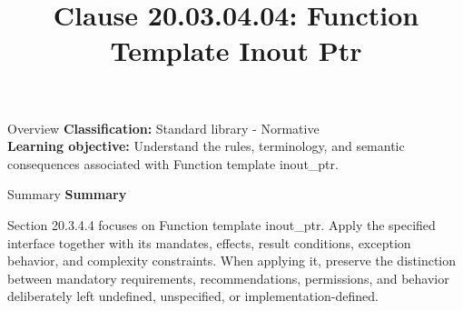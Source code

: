 \documentclass[10pt,letterpaper]{article}
\title{Clause 20.03.04.04: Function Template Inout Ptr}
\author{}
\date{}
\begin{document}
\maketitle
\begin{CornellOverviewBox}{Overview}
\textbf{Classification:} Standard library - Normative\\[2pt]
\textbf{Learning objective:} Understand the rules, terminology, and semantic consequences associated with Function template inout\_ptr.
\end{CornellOverviewBox}\begin{CornellSummaryBox}{Summary}
{\sffamily\bfseries\color{Accent} Summary}\par\vspace{3pt}Section 20.3.4.4 focuses on Function template inout\_ptr. Apply the specified interface together with its mandates, effects, result conditions, exception behavior, and complexity constraints. When applying it, preserve the distinction between mandatory requirements, recommendations, permissions, and behavior deliberately left undefined, unspecified, or implementation-defined.
\end{CornellSummaryBox}
\end{document}
